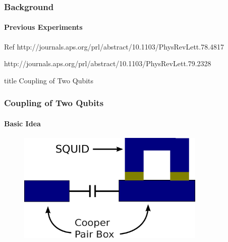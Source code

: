 \documentclass{beamer}
\begin{document}

\begin{frame}
    \frametitle{Background}
    \framesubtitle{Previous Experiments}
    \begin{block}{}
    \end{block}
    \begin{block}{}
    \end{block}
    \begin{block}{Ref}
        \fontsize{6}{7.2}\selectfont
        http://journals.aps.org/prl/abstract/10.1103/PhysRevLett.78.4817

        http://journals.aps.org/prl/abstract/10.1103/PhysRevLett.79.2328
    \end{block}
\end{frame}


\begin{frame}
    \vfill
    \centering
    \begin{beamercolorbox}[sep=8pt,center,shadow=true,rounded=true]{title}
        Coupling of Two Qubits
    \end{beamercolorbox}
    \vfill
\end{frame}


\begin{frame}
    \frametitle{Coupling of Two Qubits}
    \framesubtitle{Basic Idea}
    \begin{figure}[!htb]
        \centering
        \includegraphics[width=0.8\textwidth]{img/basic-structure.eps}
    \end{figure}
\end{frame}
\end{document}
